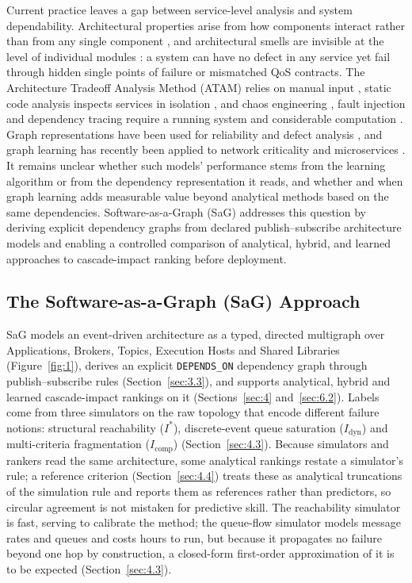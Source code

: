 Current practice leaves a gap between service-level analysis and system dependability. Architectural properties arise from how components interact rather than from any single component \cite{perry1992foundations}, and architectural smells are invisible at the level of individual modules \cite{garcia2009catalogue}: a system can have no defect in any service yet fail through hidden single points of failure or mismatched QoS contracts. The Architecture Tradeoff Analysis Method (ATAM) relies on manual input \cite{kazman1998atam}, static code analysis inspects services in isolation \cite{sonarsource2024clean,chidamber1994metrics}, and chaos engineering \cite{basiri2016chaos}, fault injection \cite{meiklejohn2021service} and dependency tracing \cite{yu2021microrank} require a running system and considerable computation \cite{verdecchia2023greenai,schwartz2020greenai}. Graph representations have been used for reliability and defect analysis \cite{yacoub2002reliability,zimmermann2008predicting}, and graph learning has recently been applied to network criticality \cite{fan2020keyplayers,fan2019learning} and microservices \cite{khodabandeh2025linkpred}. It remains unclear whether such models' performance stems from the learning algorithm or from the dependency representation it reads, and whether and when graph learning adds measurable value beyond analytical methods based on the same dependencies. Software-as-a-Graph (SaG) addresses this question by deriving explicit dependency graphs from declared publish--subscribe architecture models and enabling a controlled comparison of analytical, hybrid, and learned approaches to cascade-impact ranking before deployment.

\subsection{The Software-as-a-Graph (SaG) Approach}
\label{sec:1.3}

SaG models an event-driven architecture as a typed, directed multigraph over Applications, Brokers, Topics, Execution Hosts and Shared Libraries (Figure~\ref{fig:1}), derives an explicit \texttt{DEPENDS\_ON} dependency graph through publish--subscribe rules (Section~\ref{sec:3.3}), and supports analytical, hybrid and learned cascade-impact rankings on it (Sections~\ref{sec:4} and~\ref{sec:6.2}). Labels come from three simulators on the raw topology that encode different failure notions: structural reachability ($I^*$), discrete-event queue saturation ($I_{\text{dyn}}$) and multi-criteria fragmentation ($I_{\text{comp}}$) (Section~\ref{sec:4.3}). Because simulators and rankers read the same architecture, some analytical rankings restate a simulator's rule; a reference criterion (Section~\ref{sec:4.4}) treats these as analytical truncations of the simulation rule and reports them as references rather than predictors, so circular agreement is not mistaken for predictive skill. The reachability simulator is fast, serving to calibrate the method; the queue-flow simulator models message rates and queues and costs hours to run, but because it propagates no failure beyond one hop by construction, a closed-form first-order approximation of it is to be expected (Section~\ref{sec:4.3}).

